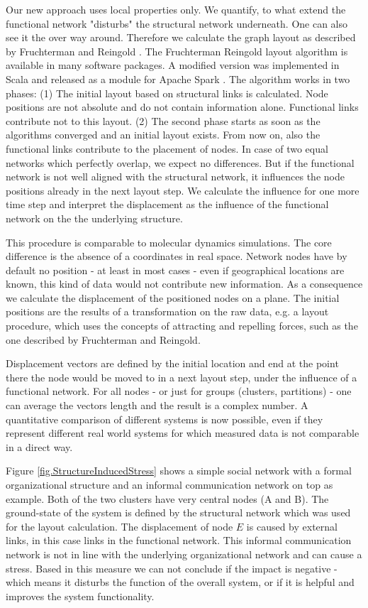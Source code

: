 \documentclass[a4paper,10pt]{scrbook}
\begin{document}
Our new approach uses local properties only. We quantify, to what extend the functional network "disturbs" the structural network underneath. One can also see it the over way around. Therefore we calculate the graph layout as described by Fruchterman and Reingold \cite{Fruchterman1991}. The Fruchterman Reingold layout algorithm is available in many software packages. A modified version was implemented in Scala and released as a module for Apache Spark \cite{ScalableLayoutOnSpark}. The algorithm works in two phases: (1) The initial layout based on structural links is calculated. Node positions are not absolute and do not contain information alone. Functional links contribute not to this layout. (2) The second phase starts as soon as the algorithms converged and an initial layout exists. From now on, also the functional links contribute to the placement of nodes. In case of two equal networks which perfectly overlap, we expect no differences. But if the functional network is not well aligned with the structural network, it influences the node positions already in the next layout step. We calculate the influence for one more time step and interpret the displacement as the influence of the functional network on the the underlying structure.

This procedure is comparable to molecular dynamics simulations. The core difference is the absence of a coordinates in real space. Network nodes have by default no position - at least in most cases - even if geographical locations are known, this kind of data would not contribute new information. As a consequence we calculate the displacement of the positioned nodes on a plane. The initial positions are the results of a transformation on the raw data, e.g. a layout procedure, which uses the concepts of attracting and repelling forces, such as the one described by Fruchterman and Reingold. 
 
Displacement vectors are defined by the initial location and end at the point there the node would be moved to in a next layout step, under the influence of a functional network. For all nodes - or just for groups (clusters, partitions) - one can average the vectors length and the result is a complex number. A quantitative comparison of different systems is now possible, even if they represent different real world systems for which measured data is not comparable in a direct way. 

Figure \ref{fig.StructureInducedStress} shows a simple social network with a formal organizational structure and an informal communication network on top as example. Both of the two clusters have very central nodes (A and B). The ground-state of the system is defined by the structural network which was used for the layout calculation. The displacement of node $E$ is caused by external links, in this case links in the functional network. This informal communication network is not in line with the underlying organizational network and can cause a stress. Based in this measure we can not conclude if the impact is negative - which means it disturbs the function of the overall system, or if it is helpful and improves the system functionality. 
\end{document}
